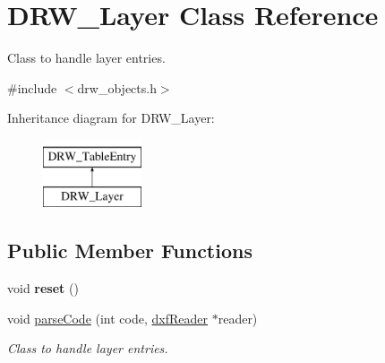 \hypertarget{classDRW__Layer}{\section{D\-R\-W\-\_\-\-Layer Class Reference}
\label{classDRW__Layer}
}


Class to handle layer entries.  




{\ttfamily \#include $<$drw\-\_\-objects.\-h$>$}

Inheritance diagram for D\-R\-W\-\_\-\-Layer\-:\begin{figure}[H]
\begin{center}
\leavevmode
\includegraphics[height=2.000000cm]{classDRW__Layer}
\end{center}
\end{figure}
\subsection*{Public Member Functions}
\begin{DoxyCompactItemize}
\item 
\hypertarget{classDRW__Layer_ad0da2865c6fca9dc0e073d9f24016bf2}{void {\bfseries reset} ()}\label{classDRW__Layer_ad0da2865c6fca9dc0e073d9f24016bf2}

\item 
void \hyperlink{classDRW__Layer_a3963fb621c29ebeac7b9a75159f37581}{parse\-Code} (int code, \hyperlink{classdxfReader}{dxf\-Reader} $\ast$reader)
\begin{DoxyCompactList}\small\item\em Class to handle layer entries. \end{DoxyCompactList}\end{DoxyCompactItemize}
